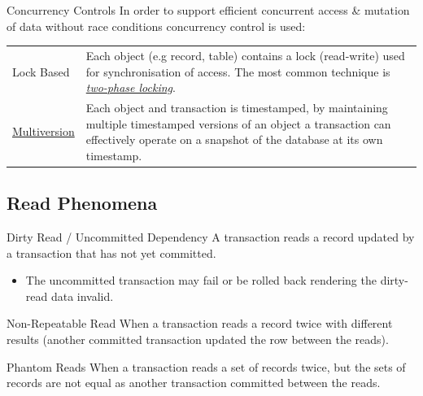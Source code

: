 \begin{sidenotebox}{Concurrency Controls}
    In order to support efficient concurrent access \& mutation of data without race conditions concurrency control is used:
    \begin{center}
        \begin{tabular}{l p{}}
            Lock Based & Each object (e.g record, table) contains a lock (read-write) used for synchronisation of access. The most common technique is \href{https://en.wikipedia.org/wiki/Two-phase_locking}{\textit{two-phase locking}}. \\
            \href{https://en.wikipedia.org/wiki/Multiversion_concurrency_control}{Multiversion} & Each object and transaction is timestamped, by maintaining multiple timestamped versions of an object a transaction can effectively operate on a snapshot of the database at its own timestamp. \\
        \end{tabular}
    \end{center}
\end{sidenotebox}

\subsection{Read Phenomena}
\begin{definitionbox}{Dirty Read / Uncommitted Dependency}
    A transaction reads a record updated by a transaction that has not yet committed.
    \begin{itemize}
        \item The uncommitted transaction may fail or be rolled back rendering the dirty-read data invalid.
    \end{itemize}
\end{definitionbox}
\begin{tcbraster}[raster columns=2, raster equal height]
\begin{definitionbox}{Non-Repeatable Read}
    When a transaction reads a record twice with different results (another committed transaction updated the row between the reads).
\end{definitionbox}
\begin{definitionbox}{Phantom Reads}
    When a transaction reads a set of records twice, but the sets of records are not equal as another transaction committed between the reads.
\end{definitionbox}
\end{tcbraster}
